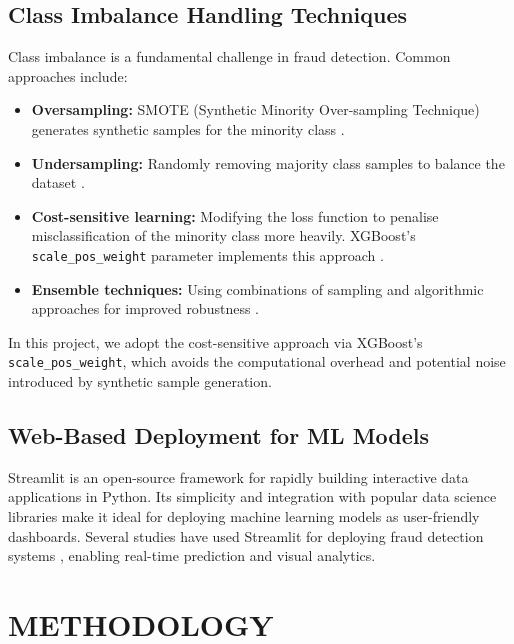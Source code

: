 \documentclass[12pt,a4paper]{report}
\begin{document}
\section{Class Imbalance Handling Techniques}

Class imbalance is a fundamental challenge in fraud detection. Common approaches include:

\begin{itemize}
    \item \textbf{Oversampling:} SMOTE (Synthetic Minority Over-sampling Technique) generates synthetic samples for the minority class \cite{chawla2002smote}.
    \item \textbf{Undersampling:} Randomly removing majority class samples to balance the dataset \cite{liu2009exploratory}.
    \item \textbf{Cost-sensitive learning:} Modifying the loss function to penalise misclassification of the minority class more heavily. XGBoost's \texttt{scale\_pos\_weight} parameter implements this approach \cite{chen2016xgboost}.
    \item \textbf{Ensemble techniques:} Using combinations of sampling and algorithmic approaches for improved robustness \cite{galar2012review}.
\end{itemize}

In this project, we adopt the cost-sensitive approach via XGBoost's \texttt{scale\_pos\_weight}, which avoids the computational overhead and potential noise introduced by synthetic sample generation.

\section{Web-Based Deployment for ML Models}

Streamlit \cite{streamlit2019} is an open-source framework for rapidly building interactive data applications in Python. Its simplicity and integration with popular data science libraries make it ideal for deploying machine learning models as user-friendly dashboards. Several studies have used Streamlit for deploying fraud detection systems \cite{taha2020intelligent}, enabling real-time prediction and visual analytics.

\chapter{METHODOLOGY}
\end{document}
